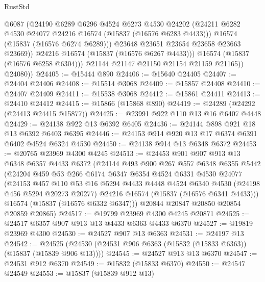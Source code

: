 \begin{lexlean}{RustStd}
\begin{coremodule}
{\begin{coremodule}
{{{{{{{{{{{{{{{{{{{{{{{{{{{{{{{{{{{{{{{{{{{{{{{{{{{{{{{{{{{{                    @6087
                    (@24190
                      @6289
                      @6296
                      @4524
                      @6273
                      @4530
                      @24202
                      (@24211 @6282 @4530 @24077 @24216 @16574 (@15837 (@16576 @6283 @4433)))
                      @16574
                      (@15837 (@16576 @6274 @6289)))
                    @23648
                    @23651
                    @23654
                    @23658
                    @23663
                    @23669))
                @24216
                @16574
                (@15837 (@16576 @6267 @4433)))
              @16574
              (@15837 (@16576 @6258 @6304)))
            @21144
            @21147
            @21150
            @21154
            @21159
            @21165))
        @24080))
@24405 := @15444 @890
@24406 := @15640 @24405
@24407 := @24404 @24406
@24408 := @15514 @3068
@24409 := @15857 @24408
@24410 := @24407 @24409
@24411 := @15538 @3068
@24412 := @15861 @24411
@24413 := @24410 @24412
@24415 := @15866 (@15868 @890)
@24419 := @24289 (@24292 (@24413 @24415 @15877))
@24425 := @23991 @922 @110 @13 @16 @6407 @4448
@24429 := @24138 @922 @13 @6392 @6405
@24436 := @24144 @898 @921 @18 @13 @6392 @6403 @6395
@24446 := @24153 @914 @920 @13 @17 @6374 @6391 @6402 @4524 @6324 @4530
@24450 := @24138 @914 @13 @6348 @6372
@24453 := @20765 @23969 @4300 @4245
@24513 := @24453
    @901
    @907
    @913
    @13
    @6348
    @6357
    @4433
    @6372
    (@24144
      @493
      @900
      @267
      @557
      @6348
      @6355
      @5442
      (@24204
        @459
        @53
        @266
        @6174
        @6347
        @6354
        @4524
        @6331
        @4530
        @24077
        (@24153
          @457
          @110
          @53
          @16
          @5294
          @4433
          @4448
          @4524
          @6340
          @4530
          (@24198 @456 @5294 @20273 @20277)
          @24216
          @16574
          (@15837 (@16576 @6341 @4433)))
        @16574
        (@15837 (@16576 @6332 @6347)))
      @20844
      @20847
      @20850
      @20854
      @20859
      @20865)
@24517 := @19799 @23969 @4300 @4245 @20871
@24525 := @24517 @6357 @907 @913 @13 @4433 @6363 @4433 @6370
@24527 := @19819 @23969 @4300
@24530 := @24527 @907 @13 @6363
@24531 := @24197 @13
@24542 := @24525 (@24530 (@24531 @906 @6363 (@15832 (@15833 @6363)) (@15837 (@15839 @906 @13))))
@24545 := @24527 @913 @13 @6370
@24547 := @24531 @912 @6370
@24549 := @15832 (@15833 @6370)
@24550 := @24547 @24549
@24553 := @15837 (@15839 @912 @13)
}}}}}}}}}}}}}}}}}}}}}}}}}}}}}}}}}}}}}}}}}}}}}}}}}}}}}}}}}}}}
\end{coremodule}}
\end{coremodule}
\end{lexlean}
